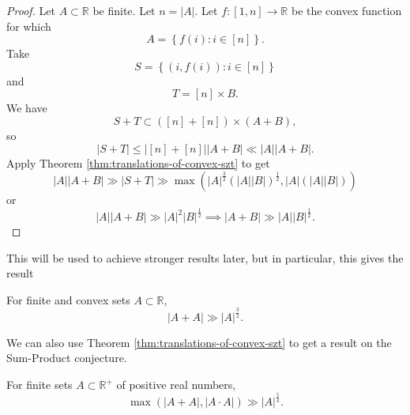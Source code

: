 \documentclass[12pt,reqno]{amsart}
\begin{document}
\begin{proof}
Let \(A \subset \mathbb{R} \) be finite. Let \(n = \left\lvert A \right\rvert \). Let \(f : [1,n] \to \mathbb{R} \) be the
convex function for which
\[
    A = \left\{ f(i) : i \in [n] \right\} 
.\]
Take
\[
    S = \left\{ (i,f(i)) : i \in [n]\right\} 
\]
and
\[
    T = [n] \times B
.\]
We have
\[
    S + T \subset \left( [n] + [n] \right)  \times \left( A + B \right) 
,\]
so
\[
    \left\lvert S + T \right\rvert \leq \left\lvert [n] + [n] \right\rvert \left\lvert A + B \right\rvert \ll \left\lvert A \right\rvert \left\lvert A + B \right\rvert 
.\]
Apply Theorem \ref{thm:translations-of-convex-szt} to get
\[
    \left\lvert A \right\rvert \left\lvert A + B \right\rvert \gg \left\lvert S + T \right\rvert \gg \max \left( \left\lvert A \right\rvert ^{\frac{3}{2} }\left( \left\lvert A \right\rvert \left\lvert B \right\rvert  \right) ^{\frac{1}{2} }, \left\lvert A \right\rvert \left( \left\lvert A \right\rvert \left\lvert B \right\rvert  \right)  \right) 
\]
or
\[
    \left\lvert A \right\rvert \left\lvert A + B \right\rvert \gg \left\lvert A \right\rvert ^{2}\left\lvert B \right\rvert ^{\frac{1}{2} } \implies  \left\lvert A + B \right\rvert \gg \left\lvert A \right\rvert \left\lvert B \right\rvert ^{\frac{1}{2} }
.\]
\end{proof}

This will be used to achieve stronger results later, but in particular, this gives the result
\begin{corollary}
For finite and convex sets \(A \subset \mathbb{R} \),
\[
    \left\lvert A+A \right\rvert \gg \left\lvert A \right\rvert ^{\frac{3}{2} }
.\]
\end{corollary}

We can also use Theorem \ref{thm:translations-of-convex-szt} to get a result
on the Sum-Product conjecture.
\begin{corollary}
    For finite sets \(A \subset \mathbb{R}^{+} \) of positive real numbers,
    \[
        \max \left( \left\lvert A+A \right\rvert, \left\lvert A\cdot A \right\rvert  \right) \gg \left\lvert A \right\rvert ^{\frac{5}{4} }
    .\]
\end{corollary}
\end{document}
